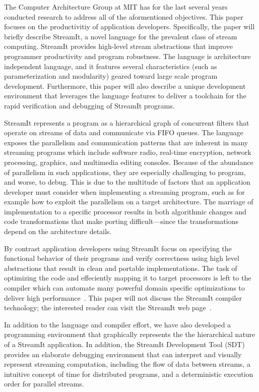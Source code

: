 \documentclass[11pt, letterpaper, onecolumn]{article}
\begin{document}
The Computer Architecture Group at  MIT has for the last several years
conducted  research to  address all  of the  aformentioned objectives.
This   paper    focuses   on   the    productivitiy   of   application
developers. Specifically, the paper  will briefly describe StreamIt, a
novel language  for the prevalent class of  stream computing. StreamIt
provides  high-level  stream   abstractions  that  improve  programmer
productivity  and  program robustness.  The  language is  architecture
independent language, and it features several characteristics (such as
parameterization  and modularity)  geared toward  large  scale program
development.  Furthermore,  this paper  will  also  describe a  unique
development  environment  that  leverages  the  language  features  to
deliver  a  toolchain for  the  rapid  verification  and debugging  of
StreamIt programs.

StreamIt represents  a program as  a hierarchical graph  of concurrent
filters  that operate  on streams  of  data and  communicate via  FIFO
queues.    The  language  exposes   the     parallelism  and
communication patterns  that are  inherent in many  streaming programs
which   include   software   radio,  real-time   encryption,   network
processing, graphics, and multimedia editing consoles.  Because of the
abundance  of parallelism  in such  applications, they  are especially
challenging  to program,  and worse,  to debug.   This is  due  to the
multitude of factors that  an application developer must consider when
implementing a streaming  program, such as for example  how to exploit
the   parallelism  on   a  target   architecture.   The   marriage  of
implementation  to a  specific processor  results in  both algorithmic
changes and  code transformations that  make porting difficult---since
the transformations depend on the architecture details.

By contrast application developers  using StreamIt focus on specifying
the functional behavior of their programs and verify correctness using
high   level  abstractions   that   result  in   clean  and   portable
implementations.   The task  of  optimizing the  code and  effeciently
mapping  it to target  processors is  left to  the compiler  which can
automate many  powerful domain specific optimizations  to deliver high
performance~\cite{streambit, linear, statespace}. This paper will not
discuss the StreamIt compiler technology; the interested reader can
visit the StreamIt web page~\cite{streamit-web}.

In  addition  to  the  language  and compiler  effort,  we  have  also
developed  a programming environment  that graphically  represents the
the hierarchical  nature of a StreamIt application.   In addition, the
StreamIt  Development  Tool  (SDT)  provides  an  elaborate  debugging
environment  that  can  interpret  and  visually  represent  streaming
computation, including  the flow of data between  streams, a intuitive
concept  of  time  for   distributed  programs,  and  a  deterministic
execution order for parallel streams.
\end{document}

